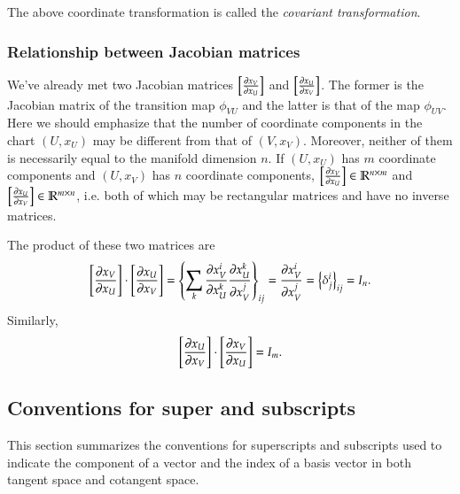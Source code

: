 \documentclass[11pt, a4paper]{book}
\begin{document}
The above coordinate transformation is called the \emph{covariant transformation}.

\subsubsection{Relationship between Jacobian matrices}

We've already met two Jacobian matrices $\left[ \frac{\partial x_V}{\partial x_U} \right]$ and
$\left[ \frac{\partial x_U}{\partial x_V} \right]$. The former is the Jacobian matrix of the
transition map $\phi_{VU}$ and the latter is that of the map $\phi_{UV}$. Here we should
emphasize that the number of coordinate components in the chart $(U,x_U)$ may be different
from that of $(V,x_V)$. Moreover, neither of them is necessarily equal to the manifold
dimension $n$. If $(U,x_U)$ has $m$ coordinate components and $(U,x_V)$ has $n$ coordinate
components, $\left[ \frac{\partial x_V}{\partial x_U} \right] \in \mathbb{R}^{n\times m}$ and
$\left[ \frac{\partial x_U}{\partial x_V} \right]\in \mathbb{R}^{m\times n}$, i.e. both of
which may be rectangular matrices and have no inverse matrices.

The product of these two matrices are
\begin{equation}
  \left[ \frac{\partial x_V}{\partial x_U} \right] \cdot \left[ \frac{\partial x_U}{\partial x_V}
  \right] = \left\{ \sum_k \frac{\partial x_V^i}{\partial x_U^k} \frac{\partial x_U^k}{\partial
      x_V^j} \right\}_{ij} = \frac{\partial x_V^i}{\partial x_V^j} = \left\{ \delta^i_j
  \right\}_{ij} = I_n.
\end{equation}
Similarly,
\begin{equation}
  \left[ \frac{\partial x_U}{\partial x_V} \right] \cdot \left[ \frac{\partial x_V}{\partial x_U} \right] = I_m.
\end{equation}

\subsection{Conventions for super and subscripts}

This section summarizes the conventions for superscripts and subscripts used to indicate
the component of a vector and the index of a basis vector in both tangent space and
cotangent space.
\end{document}
